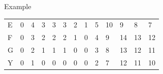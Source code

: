 \documentclass{bredelebeamer}
\begin{document}
\begin{frame}{Example}
\begin{table}[]
\begin{tabular}{*{13}{p{0.4cm}}}
\multicolumn{1}{l|}{E}  & \multicolumn{1}{l|}{0} & \multicolumn{1}{l|}{4} & \multicolumn{1}{l|}{3} & \multicolumn{1}{l|}{3} & \multicolumn{1}{l|}{3} & \multicolumn{1}{l|}{2} & \multicolumn{1}{l|}{1} & \multicolumn{1}{l|}{5} & \multicolumn{1}{l|}{10} & \multicolumn{1}{l|}{9}  & \multicolumn{1}{l|}{8}  & \multicolumn{1}{l|}{7}  \\ \cline{2-13} 
\multicolumn{1}{l|}{F}  & \multicolumn{1}{l|}{0} & \multicolumn{1}{l|}{3} & \multicolumn{1}{l|}{2} & \multicolumn{1}{l|}{2} & \multicolumn{1}{l|}{2} & \multicolumn{1}{l|}{1} & \multicolumn{1}{l|}{0} & \multicolumn{1}{l|}{4} & \multicolumn{1}{l|}{9}  & \multicolumn{1}{l|}{14} & \multicolumn{1}{l|}{13} & \multicolumn{1}{l|}{12} \\ \cline{2-13} 
\multicolumn{1}{l|}{G}  & \multicolumn{1}{l|}{0} & \multicolumn{1}{l|}{2} & \multicolumn{1}{l|}{1} & \multicolumn{1}{l|}{1} & \multicolumn{1}{l|}{1} & \multicolumn{1}{l|}{0} & \multicolumn{1}{l|}{0} & \multicolumn{1}{l|}{3} & \multicolumn{1}{l|}{8}  & \multicolumn{1}{l|}{13} & \multicolumn{1}{l|}{12} & \multicolumn{1}{l|}{11} \\ \cline{2-13} 
\multicolumn{1}{l|}{Y}  & \multicolumn{1}{l|}{0} & \multicolumn{1}{l|}{1} & \multicolumn{1}{l|}{0} & \multicolumn{1}{l|}{0} & \multicolumn{1}{l|}{0} & \multicolumn{1}{l|}{0} & \multicolumn{1}{l|}{0} & \multicolumn{1}{l|}{2} & \multicolumn{1}{l|}{7}  & \multicolumn{1}{l|}{12} & \multicolumn{1}{l|}{11} & \multicolumn{1}{l|}{10} \\ \cline{2-13} 
\end{tabular}
\end{table}
 \end{frame}
 
\end{document}
